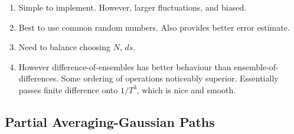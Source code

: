 \begin{enumerate}
  \item Simple to implement.  However, larger fluctuations, and biased. 
  \item Best to use common random numbers.  Also provides better error estimate.
  \item Need to balance choosing $N$, $ds$.  
  \item However difference-of-ensembles has better behaviour than 
    ensemble-of-differences.  Some ordering of operations noticeably superior.  
    Essentially passes finite difference onto $1/T^3$, which is nice and smooth.
\end{enumerate}

\subsection{Partial Averaging-Gaussian Paths}

